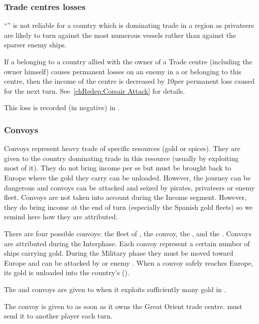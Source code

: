 \subsubsection{Trade centres losses}
\aparag ``'' is not reliable for a country which
is dominating trade in a region as privateers are likely to turn against
the most numerous vessels rather than against the sparser enemy ships.

\aparag If a \corsaire belonging to a country allied with the owner of
a Trade centre (including the owner himself) causes permanent losses on
an enemy \TradeFLEET in a \STZ or \CTZ belonging to this centre, then
the income of the centre is decreased by 10\ducats per permanent loss
caused for the next turn.
\bparag See~\ref{chRedep:Corsair Attack} for details.

\aparag This loss is recorded (in negative) in .

\subsubsection{Convoys}
\aparag Convoys represent heavy trade of specific resources (gold or
spices). They are given to the country dominating trade in this resource
(usually by exploiting most of it). They do not bring income per se but
must be brought back to Europe where the gold they carry can be
unloaded. However, the journey can be dangerous and convoys can be
attacked and seized by pirates, privateers or enemy fleet.
\bparag Convoys are not taken into account during the Income
segment. However, they do bring income at the end of turn (especially
the Spanish gold fleets) so we remind here how they are
attributed.

\aparag There are four possible convoys: the  fleet of
, the  convoy, the ,
and the .
\bparag Convoys are attributed during the Interphase.
\bparag Each convoy represent a certain number of ships carrying
gold. During the Military phase they must be moved toward Europe and can
be attacked by \corsaire or enemy \FLEET.
\bparag When a convoy safely reaches Europe, its gold is unloaded into
the country's \RT ().

\aparag The  and  convoys are
given to \SPA when it exploits sufficiently many gold in
.

\aparag The  convoy is given to \TUR as soon as it owns
the Great Orient trade centre. \TUR must send it to another player each
turn.

